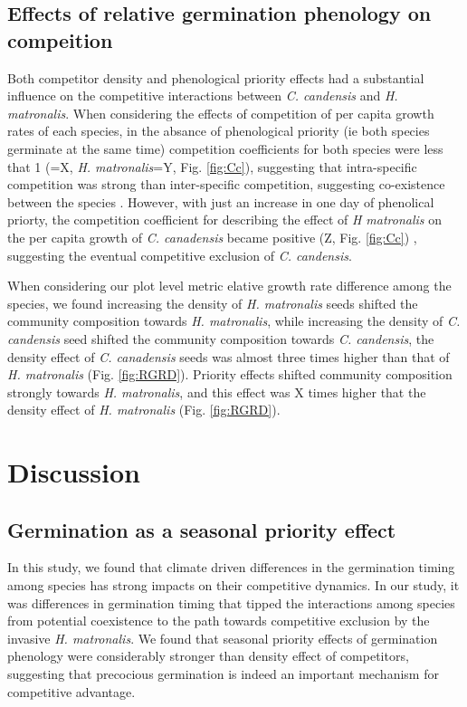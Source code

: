 \documentclass{article}\usepackage[]{graphicx}\usepackage[]{color}
\begin{document}
\subsection*{Effects of relative germination phenology on compeition}
Both competitor density and phenological priority effects had a substantial influence on the competitive interactions between \textit{C. candensis} and \textit{H. matronalis}. 
When considering the effects of competition of per capita growth rates of each species, in the absance of phenological priority (ie both species germinate at the same time) competition coefficients for both species were less that 1 (=X, \textit{H. matronalis}=Y, Fig. \ref{fig:Cc}), suggesting that intra-specific competition was strong than inter-specific competition, suggesting co-existence between the species \citep{}. However, with just an increase in one day of phenolical priorty, the competition coefficient for describing the effect of \textit{H matronalis} on the per capita growth of \textit{C. canadensis} became positive  (Z, Fig. \ref{fig:Cc}) , suggesting the eventual competitive exclusion of \textit{C. candensis}.

When considering our plot level metric elative growth rate difference among the species, we found increasing the density of \textit{H. matronalis} seeds shifted the community composition towards \textit{H. matronalis}, while increasing the density of \textit{C. candensis} seed shifted the community composition towards \textit{C. candensis}, the density effect of \textit{C. canadensis} seeds was almost three times higher than that of \textit{H. matronalis} (Fig. \ref{fig:RGRD}). Priority effects shifted community composition strongly towards \textit{H. matronalis}, and this effect was X times higher that the density effect of \textit{H. matronalis} (Fig. \ref{fig:RGRD}).

\section*{Discussion}
\subsection*{Germination as a seasonal priority effect} 
In this study, we found that climate driven differences in the germination timing among species has strong impacts on their competitive dynamics. In our study, it was differences in germination timing that tipped the interactions among species from potential coexistence to the path towards competitive exclusion by the invasive \textit{H. matronalis}. We found that seasonal priority effects of germination phenology were considerably stronger than density effect of competitors, suggesting that precocious germination is indeed an important mechanism for competitive advantage. 
\end{document}
